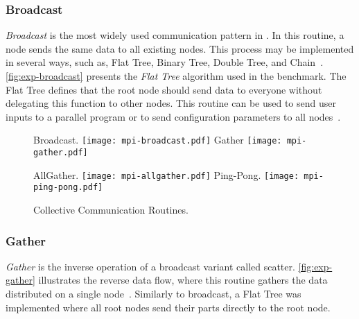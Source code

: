 			\subsubsection{Broadcast}

				\textit{Broadcast} is the most widely used communication pattern
				in \mpi. In this routine, a node sends the same data to
				all existing nodes. This process may be implemented in
				several ways, such as, Flat Tree, Binary Tree, Double Tree,
				and Chain~\cite{mpi-survey}. \autoref{fig:exp-broadcast}
				presents the \textit{Flat Tree} algorithm used in the benchmark.
				The Flat Tree defines that the root node should send data
				to everyone without delegating this function to other nodes.
				This routine can be used to send user inputs to a parallel
				program or to send configuration parameters to all
				nodes~\cite{url:mpitutorial}.

				\begin{figure}[!tb]
					\centering%
					\caption{Collective Communication Routines.}%
					\label{fig:mpi-routines}%

						{\mpi Broadcast.}%
						{\texttt{[image: mpi-broadcast.pdf]}}%
					\hspace{1cm}%
						{\mpi Gather}%
						{\texttt{[image: mpi-gather.pdf]}}%

					\vspace{0.5cm}%

						{\mpi AllGather.}%
						{\texttt{[image: mpi-allgather.pdf]}}%
					\hspace{1cm}%
						{Ping-Pong.}%
						{\texttt{[image: mpi-ping-pong.pdf]}}%

				\end{figure}

			\subsubsection{Gather}

				\textit{Gather} is the inverse operation of a broadcast variant
				called scatter. \autoref{fig:exp-gather} illustrates the reverse
				data flow, where this routine gathers the data distributed on a
				single node~\cite{url:mpitutorial}.	Similarly to broadcast, a
				Flat Tree was implemented where all root nodes send their parts
				directly to the root node.

